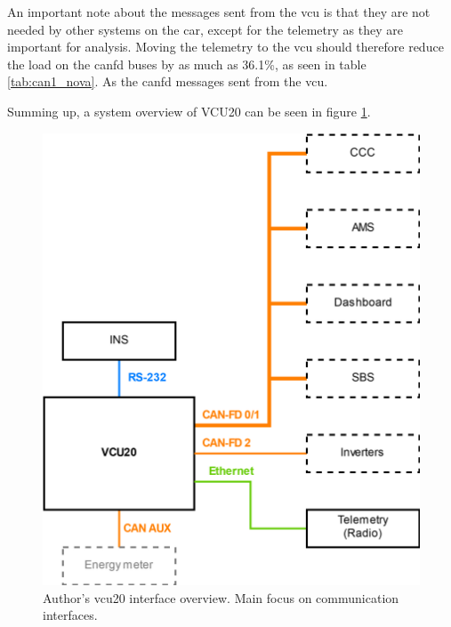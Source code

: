 An important note about the messages sent from the \acrshort{vcu} is that they are not needed by other systems on the car, except for the telemetry as they are important for analysis. Moving the telemetry to the \acrshort{vcu} should therefore reduce the load on the \acrshort{canfd} buses by as much as 36.1\%, as seen in table \ref{tab:can1_nova}. 
As the \acrshort{canfd} messages sent from the \acrshort{vcu}.

Summing up, a system overview of VCU20 can be seen in figure \ref{fig:vcu20_system}.

\begin{figure}[H]
    \centering
    \includegraphics[width=.65\textwidth]{media/vcu20_system.png}
    \caption{Author's \acrshort{vcu20} interface overview. Main focus on communication interfaces.}
    \label{fig:vcu20_system}
\end{figure}

